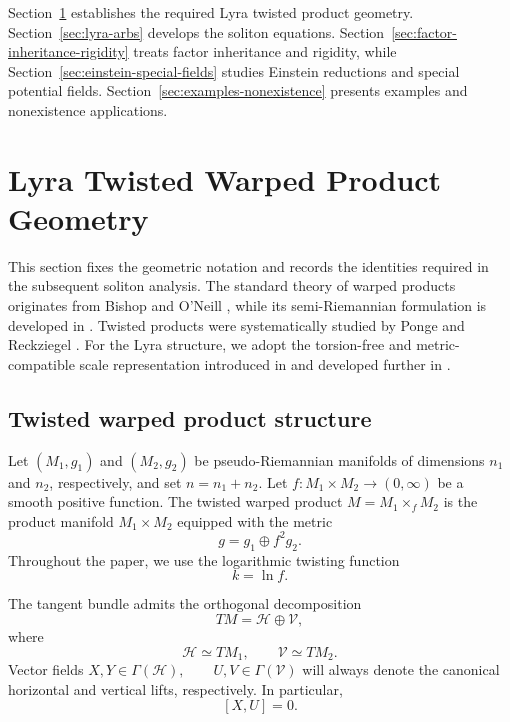 \documentclass[a4paper,11pt]{article}
\theoremstyle{plain}
\numberwithin{equation}{section}
\begin{document}
Section~\ref{sec:lyra-twisted-geometry} establishes the required
Lyra twisted product geometry.
Section~\ref{sec:lyra-arbs} develops the soliton equations.
Section~\ref{sec:factor-inheritance-rigidity} treats factor
inheritance and rigidity, while
Section~\ref{sec:einstein-special-fields} studies Einstein
reductions and special potential fields.
Section~\ref{sec:examples-nonexistence} presents examples and
nonexistence applications.

\section{Lyra Twisted Warped Product Geometry}
\label{sec:lyra-twisted-geometry}

This section fixes the geometric notation and records the identities
required in the subsequent soliton analysis. The standard theory of
warped products originates from Bishop and O'Neill
\cite{BishopONeill1969}, while its semi-Riemannian formulation is
developed in \cite{ONeill1983}. Twisted products were systematically
studied by Ponge and Reckziegel \cite{PongeReckziegel1993}. For the
Lyra structure, we adopt the torsion-free and metric-compatible
scale representation introduced in
\cite{CuzinattoMoraisPimentel2021} and developed further in
\cite{ValadaoSobreroBergliaffa2026}.

\subsection{Twisted warped product structure}
\label{subsec:twisted-product-structure}

Let $(M_{1},g_{1})$ and $(M_{2},g_{2})
$
be pseudo-Riemannian manifolds of dimensions \(n_{1}\) and
\(n_{2}\), respectively, and set
$
n=n_{1}+n_{2}.
$
Let
$
f:M_{1}\times M_{2}\longrightarrow (0,\infty)
$
be a smooth positive function. The twisted warped product
$
M=M_{1}\times_{f}M_{2}
$
is the product manifold \(M_{1}\times M_{2}\) equipped with the
metric
\begin{equation}
	g
	=
	g_{1}\oplus f^{2}g_{2}.
	\label{eq:twisted-product-metric}
\end{equation}
Throughout the paper, we use the logarithmic twisting function
\begin{equation}
	k=\ln f.
	\label{eq:logarithmic-twisting-function}
\end{equation}

The tangent bundle admits the orthogonal decomposition
\begin{equation}
	TM
	=
	\mathcal H\oplus\mathcal V,
	\label{eq:horizontal-vertical-decomposition}
\end{equation}
where
\[
\mathcal H\simeq TM_{1},
\qquad
\mathcal V\simeq TM_{2}.
\]
Vector fields
$
X,Y\in\Gamma(\mathcal H),
\qquad
U,V\in\Gamma(\mathcal V)
$
will always denote the canonical horizontal and vertical lifts,
respectively. In particular,
\[
[X,U]=0.
\]
\end{document}
